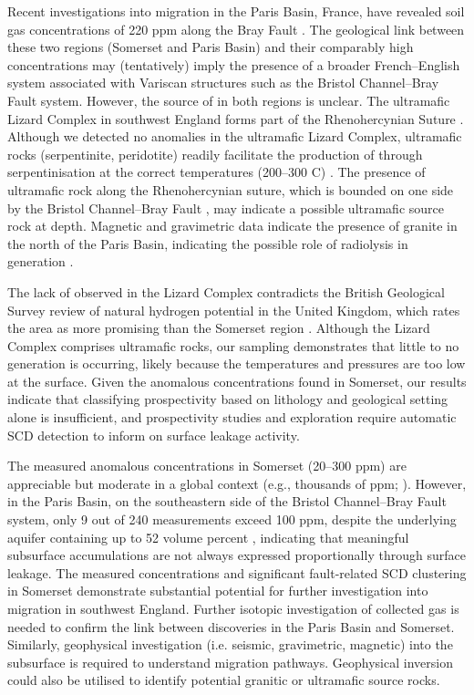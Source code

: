 \documentclass[12pt]{article}
\begin{document}
Recent investigations into  migration in the Paris Basin, France, have revealed soil gas  concentrations of 220 ppm along the Bray Fault \cite{roche}. The geological link between these two regions (Somerset and Paris Basin) and their comparably high  concentrations may (tentatively) imply the presence of a broader French--English  system associated with Variscan structures such as the Bristol Channel--Bray Fault system. However, the source of  in both regions is unclear. The ultramafic Lizard Complex in southwest England forms part of the Rhenohercynian Suture \cite{Suture, paris}. Although we detected no  anomalies in the ultramafic Lizard Complex, ultramafic rocks (serpentinite, peridotite) readily facilitate the production of  through serpentinisation at the correct temperatures (200--300 \textdegree C) \cite{MCCOLLOM2016175}. The presence of ultramafic rock along the Rhenohercynian suture, which is bounded on one side by the Bristol Channel--Bray Fault \cite{Suture}, may indicate a possible ultramafic source rock at depth. Magnetic and gravimetric data indicate the presence of granite in the north of the Paris Basin, indicating the possible role of radiolysis in  generation \cite{paris}.

The lack of  observed in the Lizard Complex contradicts the British Geological Survey review of natural hydrogen potential in the United Kingdom, which rates the area as more promising than the Somerset region \cite{nerc539907}. Although the Lizard Complex comprises ultramafic rocks, our sampling demonstrates that little to no  generation is occurring, likely because the temperatures and pressures are too low at the surface. Given the anomalous concentrations found in Somerset, our results indicate that classifying prospectivity based on lithology and geological setting alone is insufficient, and  prospectivity studies and exploration require automatic SCD detection to inform on surface  leakage activity. 

The measured anomalous concentrations in Somerset (20--300 ppm) are appreciable but moderate in a global context (e.g., thousands of ppm; \cite{Brazil, Russia, zgonnik}). However, in the Paris Basin, on the southeastern side of the Bristol Channel--Bray Fault system, only 9 out of 240 measurements exceed 100 ppm, despite the underlying aquifer containing up to 52 volume percent  \cite{Leger, paris}, indicating that meaningful subsurface accumulations are not always expressed proportionally through surface leakage. The measured  concentrations and significant fault-related SCD clustering in Somerset demonstrate substantial potential for further investigation into  migration in southwest England. Further isotopic investigation of collected  gas is needed to confirm the link between  discoveries in the Paris Basin and Somerset. Similarly, geophysical investigation (i.e. seismic, gravimetric, magnetic) into the subsurface is required to understand migration pathways. Geophysical inversion could also be utilised to identify potential granitic or ultramafic source rocks.
\end{document}
